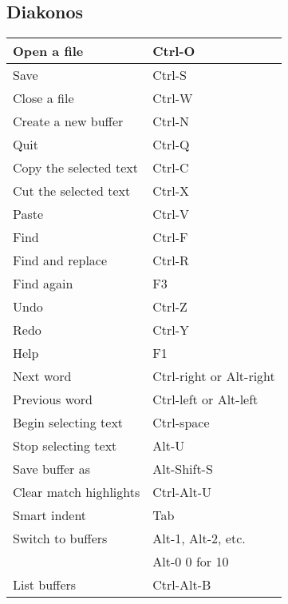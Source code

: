 \documentclass[10pt,a4paper,landscape,english,twoside]{article}
\begin{document}
\begin{multicols}{2}
\subsection*{Diakonos}
{
\setlength{\extrarowheight}{1.5pt}
\begin{tabular}[t]{|l|l|}
\hline
Open a file            & Ctrl-O\\ \hline
Save                   & Ctrl-S\\ \hline
Close a file           & Ctrl-W\\ \hline
Create a new buffer    & Ctrl-N\\ \hline
Quit                   & Ctrl-Q\\ \hline
Copy the selected text & Ctrl-C\\ \hline
Cut the selected text  & Ctrl-X\\ \hline
Paste                  & Ctrl-V\\ \hline
Find                   & Ctrl-F\\ \hline
Find and replace       & Ctrl-R\\ \hline
Find again             & F3\\ \hline
Undo                   & Ctrl-Z\\ \hline
Redo                   & Ctrl-Y\\ \hline
Help                   & F1\\ \hline
Next word              & Ctrl-right or Alt-right\\ \hline
Previous word          & Ctrl-left or Alt-left\\ \hline
Begin selecting text   & Ctrl-space\\ \hline
Stop selecting text    & Alt-U\\ \hline
Save buffer as         & Alt-Shift-S\\ \hline
Clear match highlights & Ctrl-Alt-U\\ \hline
Smart indent           & Tab\\ \hline
Switch to buffers      & Alt-1, Alt-2, etc.\\
&Alt-0 0 for 10\\ \hline
List buffers           & Ctrl-Alt-B\\ \hline
\end{tabular}
}

\end{multicols}
\end{document}
